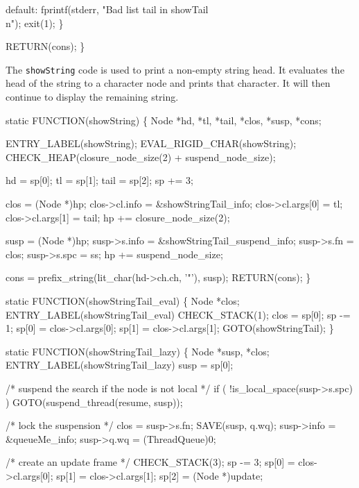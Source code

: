     default:
        fprintf(stderr, "Bad list tail in showTail\\n");
        exit(1);
    \}

    RETURN(cons);
\}

\nwendcode{}\nwdocspar
The \texttt{showString} code is used to print a non-empty string head.
It evaluates the head of the string to a character node and prints
that character. It will then continue to display the remaining string.

\nwenddocs{}\plusendmoddef\nwstartdeflinemarkup{}\nwenddeflinemarkup
static
FUNCTION(showString)
\{
    Node *hd, *tl, *tail, *clos, *susp, *cons;

 ENTRY_LABEL(showString);
    EVAL_RIGID_CHAR(showString);
    CHECK_HEAP(closure_node_size(2) + suspend_node_size);

    hd   = sp[0];
    tl   = sp[1];
    tail = sp[2];
    sp  += 3;

    clos             = (Node *)hp;
    clos->cl.info    = &showStringTail_info;
    clos->cl.args[0] = tl;
    clos->cl.args[1] = tail;
    hp              += closure_node_size(2);

    susp         = (Node *)hp;
    susp->s.info = &showStringTail_suspend_info;
    susp->s.fn   = clos;
    susp->s.spc  = ss;
    hp          += suspend_node_size;

    cons = prefix_string(lit_char(hd->ch.ch, '"'), susp);
    RETURN(cons);
\}

static
FUNCTION(showStringTail_eval)
\{
    Node *clos;
 ENTRY_LABEL(showStringTail_eval)
    CHECK_STACK(1);
    clos  = sp[0];
    sp   -= 1;
    sp[0] = clos->cl.args[0];
    sp[1] = clos->cl.args[1];
    GOTO(showStringTail);
\}

static
FUNCTION(showStringTail_lazy)
\{
    Node *susp, *clos;
 ENTRY_LABEL(showStringTail_lazy)
    susp = sp[0];

    /* suspend the search if the node is not local */
    if ( !is_local_space(susp->s.spc) )
        GOTO(suspend_thread(resume, susp));

    /* lock the suspension */
    clos = susp->s.fn;
    SAVE(susp, q.wq);
    susp->info = &queueMe_info;
    susp->q.wq = (ThreadQueue)0;

    /* create an update frame */
    CHECK_STACK(3);
    sp   -= 3;
    sp[0] = clos->cl.args[0];
    sp[1] = clos->cl.args[1];
    sp[2] = (Node *)update;

